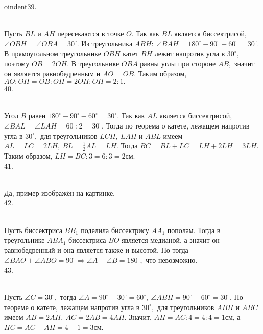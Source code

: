 oindent39. \begin{figure}[ht!]
\end{figure}\\
Пусть $BL$ и $AH$ пересекаются в точке $O.$ Так как $BL$ является биссектрисой, $\angle OBH=\angle OBA=30^\circ.$ Из треугольника $ABH:\ \angle BAH=180^\circ-90^\circ-60^\circ=30^\circ.$ В прямоугольном треугольнике $OBH$ катет $BH$ лежит напротив угла в $30^\circ,$ поэтому $OB=2OH.$ В треугольнике $OBA$ равны углы при стороне $AB,$ значит он является равнобедренным и $AO=OB.$ Таким образом, $AO:OH=OB:OH=2OH:OH=2:1.$\\
40. \begin{figure}[ht!]
\end{figure}\\
Угол $B$ равен $180^\circ-90^\circ-60^\circ=30^\circ.$ Так как $AL$ является биссектрисой, $\angle BAL= \angle LAH=60^\circ:2=30^\circ.$ Тогда по теорема о катете, лежащем напротив угла в $30^\circ,$ для треугольников $LCH,\ LAH$ и $ABL$ имеем $AL=LC=2LH,\ BL=\frac{1}{2}AL=LH.$ Тогда $BC=BL+LC=LH+2LH=3LH.$ Таким образом, $LH=BC:3=6:3=2$см.\\
41. \begin{figure}[ht!]
\end{figure}\\
Да, пример изображён на картинке.\\
42. \begin{figure}[ht!]
\end{figure}\\
Пусть биссектриса $BB_1$ поделила биссектрису $AA_1$ пополам. Тогда в треугольнике $ABA_1$ биссектриса $BO$ является медианой, а значит он равнобедренный и она является также и высотой. Но тогда $\angle BAO+\angle ABO=90^\circ\Rightarrow \angle A+\angle B=180^\circ,$ что невозможно.\\
43. \begin{figure}[ht!]
\end{figure}\\
Пусть $\angle C=30^\circ,$ тогда $\angle A=90^\circ-30^\circ=60^\circ,\ \angle ABH=90^\circ-60^\circ=30^\circ.$ По теореме о катете, лежащем напротив угла в $30^\circ,$ для треугольников $ABH$ и $ABC$ имеем $AB=2AH,\ AC=2AB=4AH.$ Значит, $AH=AC:4=4:4=1$см, а $HC=AC-AH=4-1=3$см.\\
